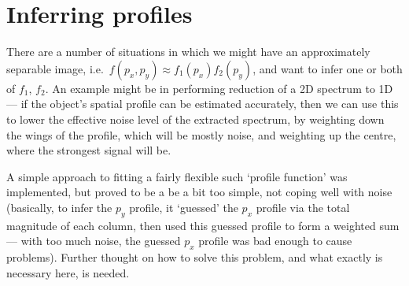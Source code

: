 \section{Inferring profiles}

There are a number of situations in which we might have an approximately
separable image, i.e.\ $f(p_x, p_y) \approx f_1(p_x)f_2(p_y)$, and want
to infer one or both of $f_1$, $f_2$. An example might be in performing
reduction of a 2D spectrum to 1D --- if the object's spatial profile can
be estimated accurately, then we can use this to lower the effective
noise level of the extracted spectrum, by weighting down the wings of
the profile, which will be mostly noise, and weighting up the centre,
where the strongest signal will be.

A simple approach to fitting a fairly flexible such `profile function'
was implemented, but proved to be a be a bit too simple, not coping well
with noise (basically, to infer the $p_y$ profile, it `guessed' the
$p_x$ profile via the total magnitude of each column, then used this
guessed profile to form a weighted sum --- with too much noise, the
guessed $p_x$ profile was bad enough to cause problems). Further thought
on how to solve this problem, and what exactly is necessary here,
is needed.
